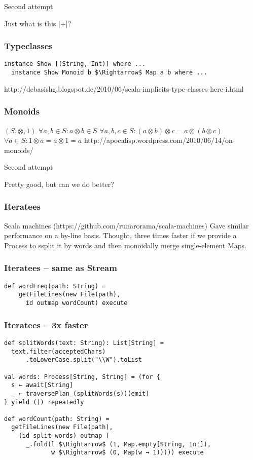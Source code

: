 \documentclass{beamer}
\begin{document}
\begin{frame}{Second attempt}
  \Large \centerline{Just what is this |+|?}
\end{frame}

\begin{frame}[fragile]
\frametitle{Typeclasses}
\begin{lstlisting}[mathescape]
  instance Show [(String, Int)] where ...
  instance Show Monoid b $\Rightarrow$ Map a b where ...
\end{lstlisting}
http://debasishg.blogspot.de/2010/06/scala-implicits-type-classes-here-i.html
\end{frame}

\begin{frame}[fragile]
\frametitle{Monoids}
\begin{center}
$(S, \otimes, 1)$\newline
$\forall a, b \in S: a \otimes b \in S$\newline
$\forall a, b, c \in S: (a \otimes b) \otimes c = a \otimes (b \otimes c)$\newline
$\forall a \in S: 1 \otimes a = a \otimes 1 = a$\newline
http://apocalisp.wordpress.com/2010/06/14/on-monoids/
\end{center}
\end{frame}

\begin{frame}{Second attempt}
  \Large \centerline{Pretty good, but can we do better?}
\end{frame}

\begin{frame}[fragile]
\frametitle{Iteratees}
Scala machines (https://github.com/runarorama/scala-machines)
Gave similar performance on a by-line basis.
Thought, three times faster if we provide a Process to ssplit it by
words and then monoidally merge single-element Maps.
\end{frame}

\begin{frame}[fragile]
\frametitle{Iteratees -- same as Stream}
\begin{lstlisting}[mathescape]
  def wordFreq(path: String) =
    getFileLines(new File(path),
      id outmap wordCount) execute
\end{lstlisting}
\end{frame}

\begin{frame}[fragile]
\frametitle{Iteratees -- 3x faster}
\begin{lstlisting}[mathescape]
def splitWords(text: String): List[String] =
  text.filter(acceptedChars)
      .toLowerCase.split("\\W").toList

val words: Process[String, String] = (for {
  s ← await[String]
  _ ← traversePlan_(splitWords(s))(emit)
} yield ()) repeatedly

def wordCount(path: String) =
  getFileLines(new File(path),
    (id split words) outmap (
      _.fold(l $\Rightarrow$ (1, Map.empty[String, Int]),
             w $\Rightarrow$ (0, Map(w → 1))))) execute
\end{lstlisting}
\end{frame}
\end{document}
